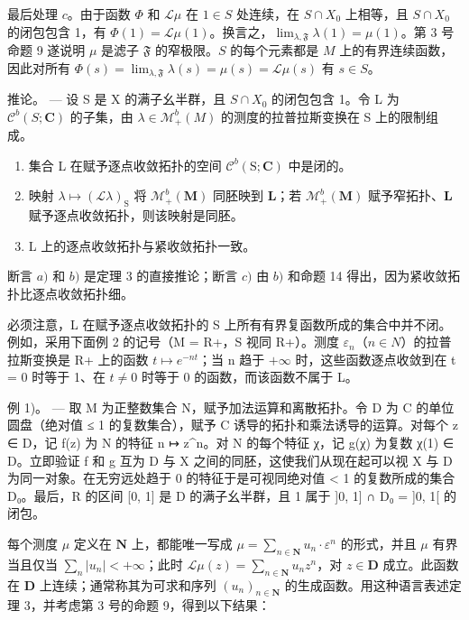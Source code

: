 最后处理 \(c\)。由于函数 \(\Phi\) 和 \(\mathcal{L}\mu\) 在 \(1 \in S\) 处连续，在 \(S \cap X_0\) 上相等，且 \(S \cap X_0\) 的闭包包含 1，有 \(\Phi(1) = \mathcal{L}\mu(1)\)。换言之，\(\lim_{\lambda, \mathfrak{F}} \lambda(1) = \mu(1)\)。第 3 号命题 9 遂说明 \(\mu\) 是滤子 \(\mathfrak{F}\) 的窄极限。\(S\) 的每个元素都是 \(M\) 上的有界连续函数，因此对所有 \(\Phi(s) = \lim_{\lambda, \mathfrak{F}} \lambda(s) = \mu(s) = \mathcal{L}\mu(s)\) 有 \(s \in S\)。

推论。 --- 设 S 是 X 的满子幺半群，且 \(S \cap X_{0}\) 的闭包包含 1。令 L 为 \(\mathcal{C}^{b}(S; \mathbf{C})\) 的子集，由 \(\lambda \in \mathcal{M}_{+}^{b}(M)\) 的测度的拉普拉斯变换在 S 上的限制组成。

\begin{enumerate}
\def\labelenumi{\alph{enumi})}
\item
  集合 L 在赋予逐点收敛拓扑的空间 \(\mathcal{C}^{b}(\mathrm{S};\mathbf{C})\) 中是闭的。
\item
映射 \(\lambda \mapsto (\mathcal{L}\lambda)_\mathrm{S}\) 将 \(\mathcal{M}_+^b (\mathbf{M})\) 同胚映到 \(\mathbf{L}\)；若 \(\mathcal{M}_+^b (\mathbf{M})\) 赋予窄拓扑、\(\mathbf{L}\) 赋予逐点收敛拓扑，则该映射是同胚。
\item
  L 上的逐点收敛拓扑与紧收敛拓扑一致。
\end{enumerate}

断言 \(a)\) 和 \(b)\) 是定理 3 的直接推论；断言 \(c)\) 由 \(b)\) 和命题 14 得出，因为紧收敛拓扑比逐点收敛拓扑细。

必须注意，L 在赋予逐点收敛拓扑的 S 上所有有界复函数所成的集合中并不闭。例如，采用下面例 2 的记号（M = R+，S 视同 R+）。测度 \(\varepsilon_{n}\)（\(n \in N\)）的拉普拉斯变换是 R+ 上的函数 \(t \mapsto e^{-nt}\)；当 n 趋于 \(+\infty\) 时，这些函数逐点收敛到在 t = 0 时等于 1、在 \(t \neq 0\) 时等于 0 的函数，而该函数不属于 L。

例 1)。 --- 取 M 为正整数集合 N，赋予加法运算和离散拓扑。令 D 为 C 的单位圆盘（绝对值 ≤ 1 的复数集合），赋予 C 诱导的拓扑和乘法诱导的运算。对每个 z ∈ D，记 f(z) 为 N 的特征 n ↦ z\^{}n。对 N 的每个特征 χ，记 g(χ) 为复数 χ(1) ∈ D。立即验证 f 和 g 互为 D 与 X 之间的同胚，这使我们从现在起可以视 X 与 D 为同一对象。在无穷远处趋于 0 的特征于是可视同绝对值 \textless{} 1 的复数所成的集合 D₀。最后，R 的区间 {[}0, 1{]} 是 D 的满子幺半群，且 1 属于 {]}0, 1{]} ∩ D₀ = {]}0, 1{[} 的闭包。

每个测度 \(\mu\) 定义在 \(\mathbf{N}\) 上，都能唯一写成 \(\mu = \sum_{n\in \mathbf{N}}u_n\cdot \varepsilon^n\) 的形式，并且 \(\mu\) 有界当且仅当 \(\sum_{n}|u_n| < +\infty\)；此时 \(\mathcal{L}\mu (z) = \sum_{n\in \mathbf{N}}u_nz^n\)，对 \(z\in \mathbf{D}\) 成立。此函数在 \(\mathbf{D}\) 上连续；通常称其为可求和序列 \((u_n)_{n\in \mathbf{N}}\) 的生成函数。用这种语言表述定理 3，并考虑第 3 号的命题 9，得到以下结果：

